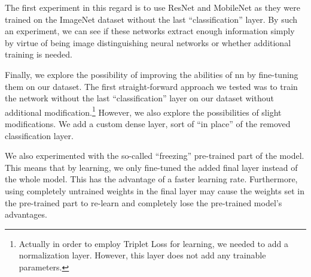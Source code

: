 The first experiment in this regard is to use ResNet and MobileNet as they were trained on the ImageNet dataset without the last ``classification'' layer. By such an experiment, we can see if these networks extract enough information simply by virtue of being image distinguishing neural networks or whether additional training is needed.

Finally, we explore the possibility of improving the abilities of \gls{nn} by fine-tuning them on our dataset. The first straight-forward approach we tested was to train the network without the last ``classification'' layer on our dataset without additional modification.\footnote{Actually in order to employ Triplet Loss for learning, we needed to add a normalization layer. However, this layer does not add any trainable parameters.} However, we also explore the possibilities of slight modifications. We add a custom dense layer, sort of ``in place'' of the removed classification layer.

We also experimented with the so-called ``freezing'' pre-trained part of the model. This means that by learning, we only fine-tuned the added final layer instead of the whole model. This has the advantage of a faster learning rate. Furthermore, using completely untrained weights in the final layer may cause the weights set in the pre-trained part to re-learn and completely lose the pre-trained model's advantages.
